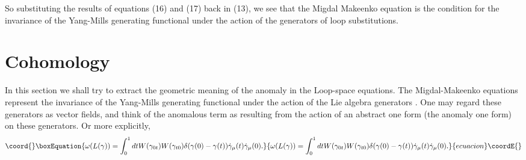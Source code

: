 \documentclass[a4paper,12]{article}
\begin{document}
So substituting the results of equations (16) and (17) back in (13), we 
see that 
the Migdal Makeenko 
equation is the condition for the invariance of the Yang-Mills generating 
functional under the action of the generators of loop substitutions. 


\section{Cohomology}

In this section we shall try to extract the geometric meaning of the 
anomaly in the Loop-space equations. The Migdal-Makeenko equations 
represent the invariance of the Yang-Mills generating functional under the 
action of the Lie algebra generators \coordHE{}. One may regard these 
generators as vector fields, and think of the anomalous term as resulting 
from the action of an abstract one form \myHighlight{$\omega $}\coordHE{} (the anomaly one form)  
 on these generators. Or 
more explicitly,
\begin{equation}\coord{}\boxEquation{
\omega (L(\gamma )) = \int _0 ^1dt W(\gamma _{0t})W(\gamma _{t0})\delta 
(\gamma (0) - \gamma (t))\dot{\gamma }_\mu (t) \dot{\gamma }_{\mu }(0). 
}{
\omega (L(\gamma )) = \int _0 ^1dt W(\gamma _{0t})W(\gamma _{t0})\delta 
(\gamma (0) - \gamma (t))\dot{\gamma }_\mu (t) \dot{\gamma }_{\mu }(0). 
}{ecuacion}\coordE{}\end{equation}
\end{document}
